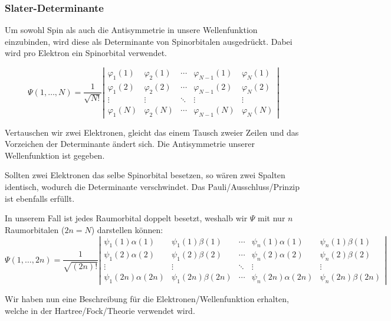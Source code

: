\cite[S. 271, 276]{levine_2019}

\subsubsection*{Slater-Determinante}
Um sowohl Spin als auch die Antisymmetrie in unsere Wellenfunktion einzubinden,
wird diese als Determinante von Spinorbitalen ausgedrückt.
Dabei wird pro Elektron ein Spinorbital verwendet.

\begin{equation}\label{slater}
\Psi(1, \dots, N) = 
\frac{1}{\sqrt{N!}}
\left\lvert
\begin{array}{ccccc} 
\varphi_1(1)  & \varphi_2(1)  & \cdots & \varphi_{N-1}(1)  & \varphi_N(1)\\ 
\varphi_1(2)  & \varphi_2(2)  & \cdots & \varphi_{N-1}(2)  & \varphi_N(2)\\ 
\vdots        & \vdots        & \ddots & \vdots            & \vdots      \\ 
\varphi_1(N)  & \varphi_2(N)  & \cdots & \varphi_{N-1}(N)  & \varphi_N(N)
\end{array}
\right\rvert
\end{equation}

Vertauschen wir zwei Elektronen, gleicht das einem Tausch zweier Zeilen
und das Vorzeichen der Determinante ändert sich.
Die Antisymmetrie unserer Wellenfunktion ist gegeben.

Sollten zwei Elektronen das selbe Spinorbital besetzen,
so wären zwei Spalten identisch, wodurch die Determinante verschwindet.
Das Pauli\-/Ausschluss\-/Prinzip ist ebenfalls erfüllt.

\cite[S. 50]{szabo_ostlund_1996}

In unserem Fall ist jedes Raumorbital doppelt besetzt,
weshalb wir $\Psi$ mit nur $n$ Raumorbitalen ($2n = N$) darstellen können:
\begin{equation}
\Psi(1, \dots, 2n) = 
\frac{1}{\sqrt{(2n)!}}
\left\lvert
\begin{array}{ccccc} 
\psi_1(1)\alpha(1) & \psi_1(1)\beta(1) & \cdots & \psi_n(1)\alpha(1) & \psi_n(1)\beta(1)\\ 
\psi_1(2)\alpha(2) & \psi_1(2)\beta(2) & \cdots & \psi_n(2)\alpha(2) & \psi_n(2)\beta(2)\\ 
    \vdots         &       \vdots      & \ddots &       \vdots       &       \vdots     \\ 
\psi_1(2n)\alpha(2n) & \psi_1(2n)\beta(2n) & \cdots & \psi_n(2n)\alpha(2n) & \psi_n(2n) \beta(2n)
\end{array}
\right\rvert
\end{equation}
\cite[S. 202]{lewars_2016}

Wir haben nun eine Beschreibung für die Elektronen\-/Wellenfunktion erhalten,
welche in der Hartree\-/Fock\-/Theorie verwendet wird.